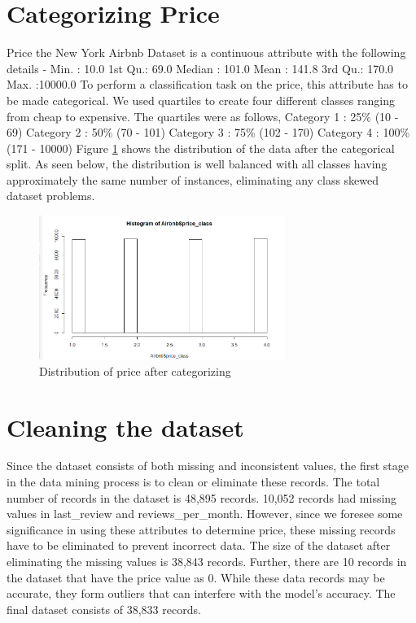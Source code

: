 \documentclass{sig-alternate}
\begin{document}
	\section{Categorizing Price}
	Price the New York Airbnb Dataset is a continuous attribute with the following details - \newline
	Min.   :    10.0  \newline
	1st Qu.:   69.0  \newline
	Median :  101.0  \newline
	Mean   :  141.8  \newline
	3rd Qu.:  170.0  \newline
	Max.   :10000.0  \newline
	To perform a classification task on the price, this attribute has to be made categorical. We used quartiles to create four different classes ranging from cheap to expensive. The quartiles were as follows,
	Category 1 : 25\% (10 - 69) \newline
	Category 2 : 50\% (70 - 101) \newline
	Category 3 : 75\% (102 - 170) \newline
	Category 4 : 100\% (171 - 10000) \newline
	Figure \ref{dist} shows the distribution of the data after the categorical split. As seen below, the distribution is well balanced with all classes having approximately the same number of instances, eliminating any class skewed dataset problems.
	\begin{figure}[ht]
		\includegraphics[width=8cm]{dist.png}
		\caption{Distribution of price after categorizing}
		\label{dist}
		\centering
	\end{figure}
	\section{Cleaning the dataset}
	Since the dataset consists of both missing and inconsistent values, the first stage in the data mining process is to clean or eliminate these records.
	The total number of records in the dataset is 48,895 records. 10,052 records had missing values in last\_review and reviews\_per\_month. However, since we foresee some significance in using these attributes to determine price, these missing records have to be eliminated to prevent incorrect data. The size of the dataset after eliminating the missing values is 38,843 records.
	Further, there are 10 records in the dataset that have the price value as 0. While these data records may be accurate, they form outliers that can interfere with the model's accuracy. 
	The final dataset consists of 38,833 records. 
\end{document}
